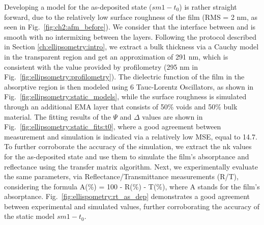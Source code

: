 Developing a model for the as-deposited state ($sm1-t_0$) is rather straight forward, due to the relatively low surface roughness of the film (RMS = 2 nm, as seen in Fig.~\ref{fig:ch2:afm_before}). We consider that the interface between  and  is smooth with no intermixing between the layers. Following the protocol described in Section \ref{ch:ellipsometry:intro}, we extract a bulk thickness via a Cauchy model in the transparent region and get an approximation of 291 nm, which is consistent with the value provided by profilometry (295 nm in Fig.~\ref{fig:ellipsometry:profilometry}). The dielectric function of the film in the absorptive region is then modeled using 6 Tauc-Lorentz Oscillators, as shown in Fig.~\ref{fig:ellipsometry:static_models}, while the surface roughness is simulated through an additional EMA layer that consists of 50\% voids and 50\% bulk material. The fitting results of the $\Psi$ and $\Delta$ values are shown in Fig.~\ref{fig:ellipsometry:static_fits:t0}, where a good agreement between measurement and simulation is indicated via a relatively low MSE, equal to 14.7. To further corroborate the accuracy of the simulation, we extract the nk values for the as-deposited state and use them to simulate the film's absorptance and reflectance using the transfer matrix algorithm. Next, we experimentally evaluate the same parameters, via Reflectance/Transmittance measurements (R/T), considering the formula A(\%) = 100 - R(\%) - T(\%), where A stands for the film's absorptance. Fig.~\ref{fig:ellispometry:rt_as_dep} demonstrates a good agreement between experimental and simulated values, further corroborating the accuracy of the static model $sm1-t_0$.


